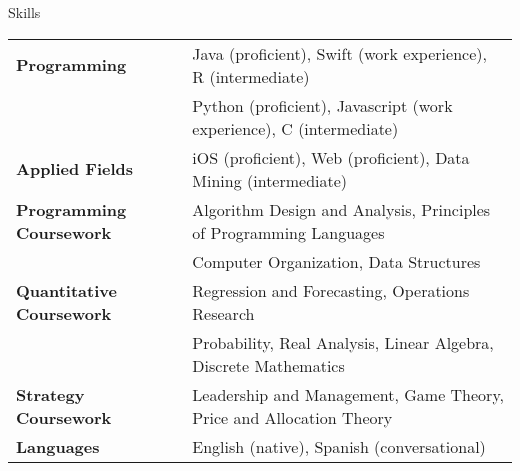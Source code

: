 \documentclass{resume} %
\begin{document}
\begin{rSection}{Skills}
  \begin{tabular}{ @{} >{\bfseries}l @{\hspace{6ex}} l }
    Programming & Java (proficient), Swift (work experience), R (intermediate)\\
    & Python (proficient), Javascript (work experience), C (intermediate) \\
    Applied Fields & iOS (proficient), Web (proficient), Data Mining (intermediate)\\
    Programming Coursework & Algorithm Design and Analysis, Principles of Programming Languages\\
    &  Computer Organization, Data Structures\\
    Quantitative Coursework & Regression and Forecasting, Operations Research\\
    & Probability, Real Analysis, Linear Algebra, Discrete Mathematics\\
    Strategy Coursework & Leadership and Management, Game Theory, Price and Allocation Theory\\
    Languages & English (native), Spanish (conversational)
  \end{tabular}

\end{rSection}
\end{document}
